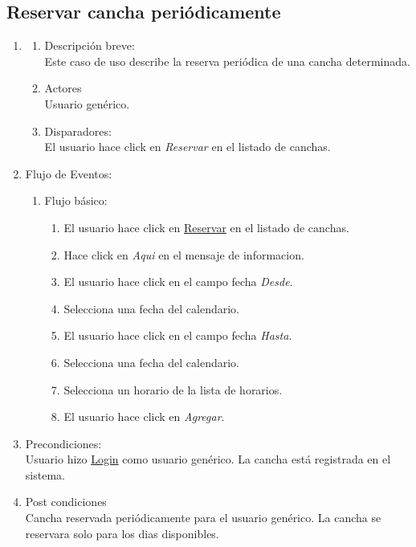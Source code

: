 \documentclass[a4paper,11pt]{article}
\begin{document}
\subsection{Reservar cancha periódicamente}
\begin{enumerate}

    \item
    \begin{enumerate}
    \item Descripción breve: \\
        Este caso de uso describe la reserva periódica de una cancha determinada.
    \item Actores \\
        Usuario genérico.
    \item Disparadores: \\
        El usuario hace click en \emph{Reservar} en el listado de canchas.
    \end{enumerate}

    \item Flujo de Eventos:

    \begin{enumerate}

        \item Flujo básico:
		\begin{enumerate}
		\item	El usuario hace click en \underline{Reservar} en el listado de canchas.
		\item	Hace click en \emph{Aqui} en el mensaje de informacion.
		\item	El usuario hace click en el campo fecha \emph{Desde}.
		\item	Selecciona una fecha del calendario.
		\item	El usuario hace click en el campo fecha \emph{Hasta}.
		\item	Selecciona una fecha del calendario.
		\item	Selecciona un horario de la lista de horarios.		
		\item	El usuario hace click en \emph{Agregar}.
		\end{enumerate}
	\end{enumerate}

    \item Precondiciones: \\
        Usuario hizo \underline{Login} como usuario genérico.
        La cancha está registrada en el sistema.

    \item Post condiciones \\
        Cancha reservada periódicamente para el usuario genérico.
	La cancha se reservara solo para los dias disponibles.
\end{enumerate}
\end{document}
